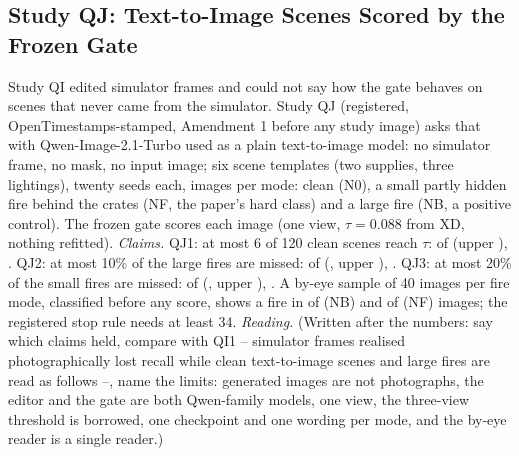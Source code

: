 \subsection{Study QJ: Text-to-Image Scenes Scored by the Frozen Gate}\label{sec:moved-qj}
Study QI edited simulator frames and could not say how the gate behaves on scenes that never came from the simulator. Study QJ (registered, OpenTimestamps-stamped, Amendment 1 before any study image) asks that with Qwen-Image-2.1-Turbo used as a plain text-to-image model: no simulator frame, no mask, no input image; six scene templates (two supplies, three lightings), twenty seeds each, \QJN{} images per mode: clean (N0), a small partly hidden fire behind the crates (NF, the paper's hard class) and a large fire (NB, a positive control). The frozen gate scores each image (one view, $\tau=0.088$ from XD, nothing refitted).
\emph{Claims.} QJ1: at most 6 of 120 clean scenes reach $\tau$: \QJFalse{} of \QJN{} (upper \QJFalseUpper), \QJClaimQJOne. QJ2: at most 10\% of the large fires are missed: \QJLargeMiss{} of \QJLargeN{} (\QJLargeRate, upper \QJLargeUpper), \QJClaimQJTwo. QJ3: at most 20\% of the small fires are missed: \QJSmallMiss{} of \QJSmallN{} (\QJSmallRate, upper \QJSmallUpper), \QJClaimQJThree. A by-eye sample of 40 images per fire mode, classified before any score, shows a fire in \QJLargeSeen{} of \QJLargeSample{} (NB) and \QJSmallSeen{} of \QJSmallSample{} (NF) images; the registered stop rule needs at least 34.
\emph{Reading.} (Written after the numbers: say which claims held, compare with QI1 -- simulator frames realised photographically lost recall while clean text-to-image scenes and large fires are read as follows --, name the limits: generated images are not photographs, the editor and the gate are both Qwen-family models, one view, the three-view threshold is borrowed, one checkpoint and one wording per mode, and the by-eye reader is a single reader.)
